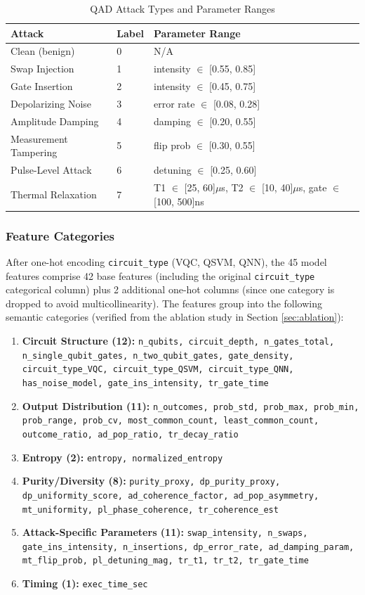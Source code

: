 \begin{table}[H]
\centering
\caption{QAD Attack Types and Parameter Ranges}
\label{tab:qad_attacks}
\begin{tabular}{lll}
\toprule
\textbf{Attack} & \textbf{Label} & \textbf{Parameter Range} \\
\midrule
Clean (benign) & 0 & N/A \\
Swap Injection & 1 & intensity $\in$ [0.55, 0.85] \\
Gate Insertion & 2 & intensity $\in$ [0.45, 0.75] \\
Depolarizing Noise & 3 & error rate $\in$ [0.08, 0.28] \\
Amplitude Damping & 4 & damping $\in$ [0.20, 0.55] \\
Measurement Tampering & 5 & flip prob $\in$ [0.30, 0.55] \\
Pulse-Level Attack & 6 & detuning $\in$ [0.25, 0.60] \\
Thermal Relaxation & 7 & T1 $\in$ [25, 60]$\mu$s, T2 $\in$ [10, 40]$\mu$s, gate $\in$ [100, 500]ns \\
\bottomrule
\end{tabular}
\end{table}

\subsubsection{Feature Categories}
After one-hot encoding \texttt{circuit\_type} (VQC, QSVM, QNN), the 45 model features comprise 42 base features (including the original \texttt{circuit\_type} categorical column) plus 2 additional one-hot columns (since one category is dropped to avoid multicollinearity). The features group into the following semantic categories (verified from the ablation study in Section \ref{sec:ablation}):

\begin{enumerate}
    \item \textbf{Circuit Structure (12):} \texttt{n\_qubits, circuit\_depth, n\_gates\_total, n\_single\_qubit\_gates, n\_two\_qubit\_gates, gate\_density, circuit\_type\_VQC, circuit\_type\_QSVM, circuit\_type\_QNN, has\_noise\_model, gate\_ins\_intensity, tr\_gate\_time}
    \item \textbf{Output Distribution (11):} \texttt{n\_outcomes, prob\_std, prob\_max, prob\_min, prob\_range, prob\_cv, most\_common\_count, least\_common\_count, outcome\_ratio, ad\_pop\_ratio, tr\_decay\_ratio}
    \item \textbf{Entropy (2):} \texttt{entropy, normalized\_entropy}
    \item \textbf{Purity/Diversity (8):} \texttt{purity\_proxy, dp\_purity\_proxy, dp\_uniformity\_score, ad\_coherence\_factor, ad\_pop\_asymmetry, mt\_uniformity, pl\_phase\_coherence, tr\_coherence\_est}
    \item \textbf{Attack-Specific Parameters (11):} \texttt{swap\_intensity, n\_swaps, gate\_ins\_intensity, n\_insertions, dp\_error\_rate, ad\_damping\_param, mt\_flip\_prob, pl\_detuning\_mag, tr\_t1, tr\_t2, tr\_gate\_time}
    \item \textbf{Timing (1):} \texttt{exec\_time\_sec}
\end{enumerate}

